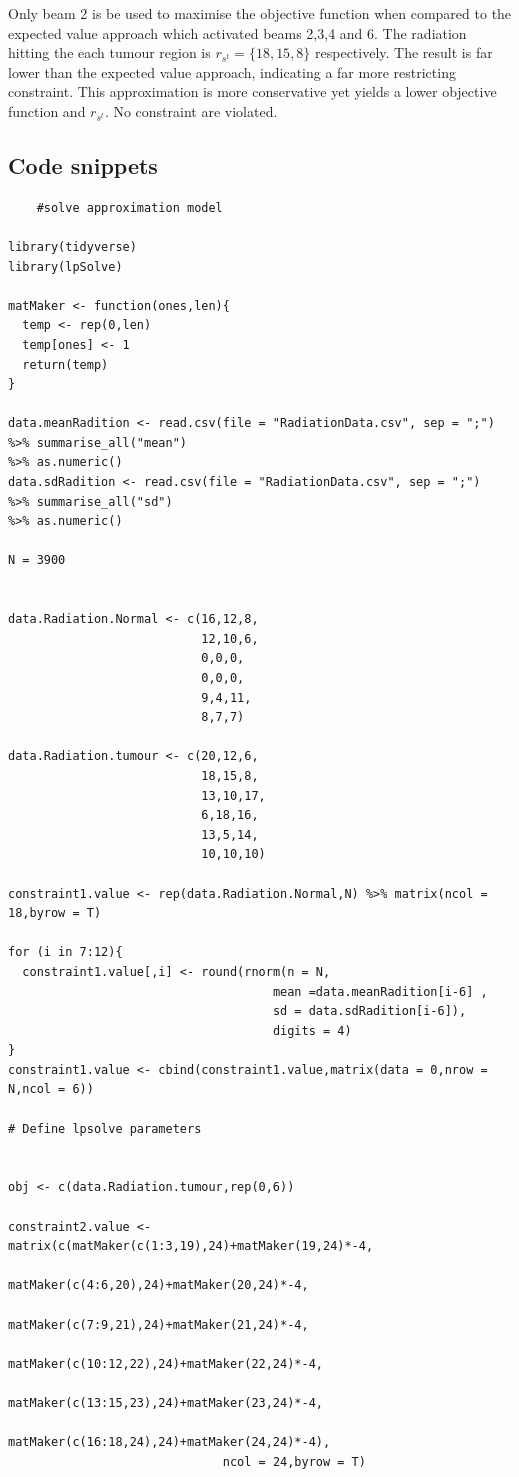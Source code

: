\documentclass[a4paper,11pt]{article}
\begin{document}
Only beam 2 is be used to maximise the objective function when compared to the expected value approach which activated beams 2,3,4 and 6. The radiation hitting the each tumour region is $r_{s^t}=\{18 ,15,  8\}$ respectively. The result is far lower than the expected value approach, indicating a far more restricting constraint. This approximation is more conservative yet yields a lower objective function and $r_{s^t}$. No constraint are violated.


\label{code:q2c}
\subsection{Code snippets}

\begin{verbatim}
	#solve approximation model

library(tidyverse)
library(lpSolve)

matMaker <- function(ones,len){
  temp <- rep(0,len)
  temp[ones] <- 1
  return(temp)
}

data.meanRadition <- read.csv(file = "RadiationData.csv", sep = ";") 
%>% summarise_all("mean") 
%>% as.numeric()
data.sdRadition <- read.csv(file = "RadiationData.csv", sep = ";") 
%>% summarise_all("sd") 
%>% as.numeric()

N = 3900


data.Radiation.Normal <- c(16,12,8,
                           12,10,6,
                           0,0,0,
                           0,0,0,
                           9,4,11,
                           8,7,7)

data.Radiation.tumour <- c(20,12,6,
                           18,15,8,
                           13,10,17,
                           6,18,16,
                           13,5,14,
                           10,10,10)

constraint1.value <- rep(data.Radiation.Normal,N) %>% matrix(ncol = 18,byrow = T)

for (i in 7:12){
  constraint1.value[,i] <- round(rnorm(n = N,
  									 mean =data.meanRadition[i-6] ,
  									 sd = data.sdRadition[i-6]),
  									 digits = 4)
}
constraint1.value <- cbind(constraint1.value,matrix(data = 0,nrow = N,ncol = 6))

# Define lpsolve parameters


obj <- c(data.Radiation.tumour,rep(0,6))

constraint2.value <- matrix(c(matMaker(c(1:3,19),24)+matMaker(19,24)*-4,
                              matMaker(c(4:6,20),24)+matMaker(20,24)*-4,
                              matMaker(c(7:9,21),24)+matMaker(21,24)*-4,
                              matMaker(c(10:12,22),24)+matMaker(22,24)*-4,
                              matMaker(c(13:15,23),24)+matMaker(23,24)*-4,
                              matMaker(c(16:18,24),24)+matMaker(24,24)*-4),
                              ncol = 24,byrow = T)


\end{verbatim}
\end{document}
